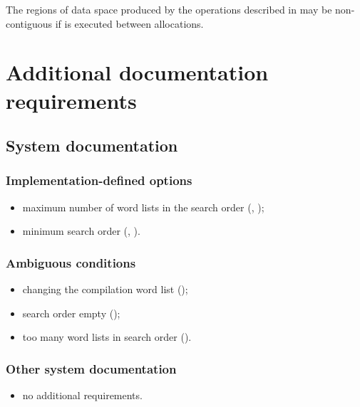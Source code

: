 The regions of data space produced by the operations described in
 may be
non-contiguous if  is executed between allocations.

\section{Additional documentation requirements} %

\subsection{System documentation} %

\subsubsection{Implementation-defined options} %

\begin{itemize}
\item maximum number of word lists in the search order
	(,
	 );
\item minimum search order
	(,
	 ).
\end{itemize}

\subsubsection{Ambiguous conditions} %

\begin{itemize}
\item changing the compilation word list
	();
\item search order empty
	();
\item too many word lists in search order
	().
\end{itemize}

\subsubsection{Other system documentation} %

\begin{itemize}
\item no additional requirements.
\end{itemize}

